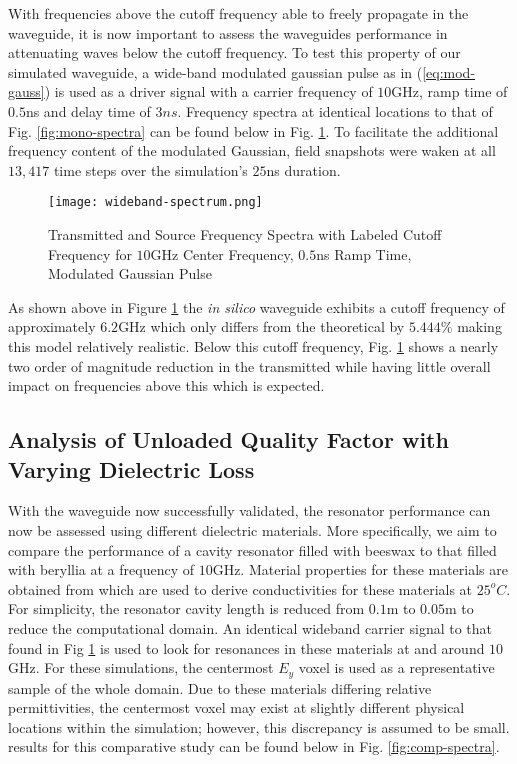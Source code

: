 With frequencies above the cutoff frequency able to freely propagate in the waveguide, it is now important to assess the waveguides performance in attenuating waves below the cutoff frequency. To test this property of our simulated waveguide, a wide-band modulated gaussian pulse as in (\ref{eq:mod-gauss}) is used as a driver signal with a carrier frequency of $10$GHz, ramp time of $0.5$ns and delay time of $3ns$. Frequency spectra at identical locations to that of Fig. \ref{fig:mono-spectra} can be found below in Fig. \ref{fig:wide-spectra}. To facilitate the additional frequency content of the modulated Gaussian, field snapshots were waken at all $13,417$ time steps over the simulation's $25$ns duration.  

\begin{figure}[h!]  
	\centering
	\texttt{[image: wideband-spectrum.png]} 
	\caption{Transmitted and Source Frequency Spectra with Labeled Cutoff Frequency for $10$GHz Center Frequency, $0.5$ns Ramp Time, Modulated Gaussian Pulse}
	\label{fig:wide-spectra}
\end{figure}

As shown above in Figure \ref{fig:wide-spectra} the \textit{in silico} waveguide exhibits a cutoff frequency of approximately $6.2$GHz which only differs from the theoretical by $5.444\%$ making this model relatively realistic. Below this cutoff frequency, Fig. \ref{fig:wide-spectra} shows a nearly two order of magnitude reduction in the transmitted while having little overall impact on frequencies above this which is expected.

\subsection{Analysis of Unloaded Quality Factor with Varying Dielectric Loss}
\label{subsec:dielectric-loss}
With the waveguide now successfully validated, the resonator performance can now be assessed using different dielectric materials. More specifically, we aim to compare the performance of a cavity resonator filled with beeswax to that filled with beryllia at a frequency of $10$GHz. Material properties for these materials are obtained from \cite{pozar2011microwave} which are used to derive conductivities for these materials at $25^oC$. For simplicity, the resonator cavity length is reduced from $0.1$m to $0.05$m to reduce the computational domain. An identical wideband carrier signal to that found in Fig \ref{fig:wide-spectra} is used to look for resonances in these materials at and around $10$GHz. For these simulations, the centermost $E_y$ voxel is used as a representative sample of the whole domain. Due to these materials differing relative permittivities, the centermost voxel may exist at slightly different physical locations within the simulation; however, this discrepancy is assumed to be small. results for this comparative study can be found below in Fig. \ref{fig:comp-spectra}.

